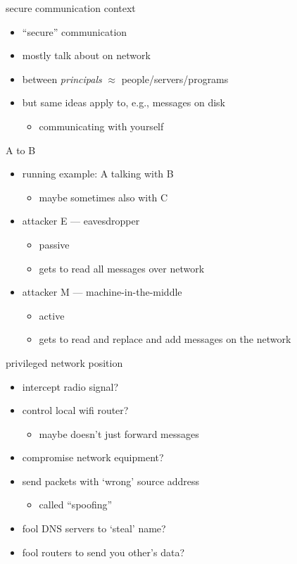 \begin{frame}{secure communication context}
    \begin{itemize}
    \item ``secure'' communication
    \item mostly talk about on network
    \item between \textit{principals} $\approx$ people/servers/programs
    \vspace{.5cm}
    \item but same ideas apply to, e.g., messages on disk
        \begin{itemize}
        \item communicating with yourself
        \end{itemize}
    \end{itemize}
\end{frame}

\begin{frame}{A to B}
    \begin{itemize}
    \item running example: A talking with B
        \begin{itemize}
        \item maybe sometimes also with C
        \end{itemize}
    \item attacker E --- eavesdropper
        \begin{itemize}
        \item passive
        \item gets to read all messages over network
        \end{itemize}
    \item attacker M --- machine-in-the-middle
        \begin{itemize}
        \item active
        \item gets to read and replace and add messages on the network
        \end{itemize}
    \end{itemize}
\end{frame}

\begin{frame}{privileged network position}
    \begin{itemize}
    \item intercept radio signal?
    \item control local wifi router?
        \begin{itemize}
        \item maybe doesn't just forward messages
        \end{itemize}
    \item compromise network equipment?
    \item send packets with `wrong' source address
        \begin{itemize}
        \item called ``spoofing''
        \end{itemize}
    \item fool DNS servers to `steal' name?
    \item fool routers to send you other's data?
    \end{itemize}
\end{frame}
